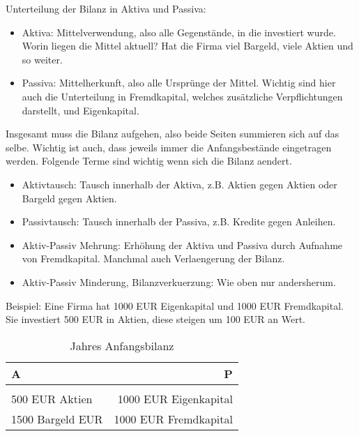 \documentclass[a4paper]{article}
\begin{document}
Unterteilung der Bilanz in Aktiva und Passiva:

\begin{itemize}
	\item Aktiva: Mittelverwendung, also alle Gegenstände, in die
	      investiert wurde. Worin liegen die Mittel aktuell? Hat die Firma
	      viel Bargeld, viele Aktien und so weiter.

	\item Passiva: Mittelherkunft, also alle Ursprünge der Mittel.
	      Wichtig sind hier auch die Unterteilung in Fremdkapital, welches
	      zusätzliche Verpflichtungen darstellt, und Eigenkapital.
\end{itemize}

Insgesamt muss die Bilanz aufgehen,
also beide Seiten summieren sich auf das selbe.
Wichtig ist auch, dass jeweils immer die Anfangsbestände eingetragen werden.
Folgende Terme sind wichtig wenn sich die Bilanz aendert.

\begin{itemize}
	\item Aktivtausch: Tausch innerhalb der Aktiva, z.B. Aktien gegen
	      Aktien oder Bargeld gegen Aktien.

	\item Passivtausch: Tausch innerhalb der Passiva, z.B. Kredite gegen
	      Anleihen.

	\item Aktiv-Passiv Mehrung: Erhöhung der Aktiva und Passiva
	      durch Aufnahme von Fremdkapital. Manchmal auch Verlaengerung
	      der Bilanz.

	\item Aktiv-Passiv Minderung, Bilanzverkuerzung: Wie oben nur andersherum.
\end{itemize}

Beispiel: Eine Firma hat 1000 EUR Eigenkapital und 1000 EUR Fremdkapital.
Sie investiert 500 EUR in Aktien, diese steigen um 100 EUR an Wert.

\begin{table}
	\centering
	\label{tab:label}
	\caption{Jahres Anfangsbilanz}
	\begin{tabular}{l|r}
		A                & P                     \\
		\hline                                   \\
		500 EUR Aktien   & 1000 EUR Eigenkapital \\
		1500 Bargeld EUR & 1000 EUR Fremdkapital \\
	\end{tabular}
\end{table}
\end{document}
